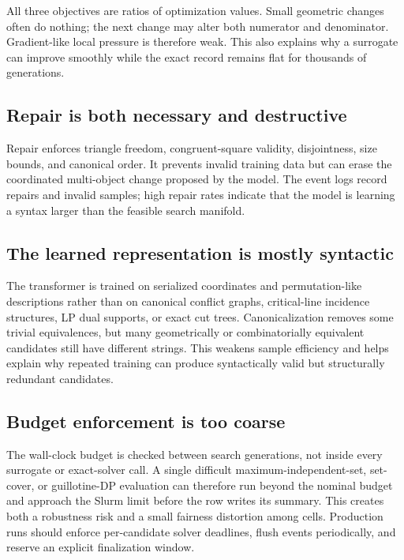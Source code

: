 \documentclass[11pt]{article}
\begin{document}
All three objectives are ratios of optimization values.  Small geometric
changes often do nothing; the next change may alter both numerator and
denominator.  Gradient-like local pressure is therefore weak.  This also
explains why a surrogate can improve smoothly while the exact record remains
flat for thousands of generations.

\subsection{Repair is both necessary and destructive}

Repair enforces triangle freedom, congruent-square validity, disjointness,
size bounds, and canonical order.  It prevents invalid training data but can
erase the coordinated multi-object change proposed by the model.  The event
logs record repairs and invalid samples; high repair rates indicate that the
model is learning a syntax larger than the feasible search manifold.

\subsection{The learned representation is mostly syntactic}

The transformer is trained on serialized coordinates and permutation-like
descriptions rather than on canonical conflict graphs, critical-line
incidence structures, LP dual supports, or exact cut trees.  Canonicalization
removes some trivial equivalences, but many geometrically or combinatorially
equivalent candidates still have different strings.  This weakens sample
efficiency and helps explain why repeated training can produce syntactically
valid but structurally redundant candidates.

\subsection{Budget enforcement is too coarse}

The wall-clock budget is checked between search generations, not inside every
surrogate or exact-solver call.  A single difficult maximum-independent-set,
set-cover, or guillotine-DP evaluation can therefore run beyond the nominal
budget and approach the Slurm limit before the row writes its summary.  This
creates both a robustness risk and a small fairness distortion among cells.
Production runs should enforce per-candidate solver deadlines, flush events
periodically, and reserve an explicit finalization window.
\end{document}
